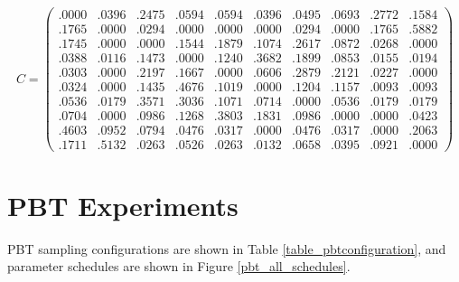 \documentclass{article}
\begin{document}
\begin{table*}
$~$
\begin{equation}
\label{eqn:c_asym_rte}
C = \begin{pmatrix} 
.0000 & .0396 & .2475 & .0594 & .0594 & .0396 & .0495 & .0693 & .2772 & .1584 \\
.1765 & .0000 & .0294 & .0000 & .0000 & .0000 & .0294 & .0000 & .1765 & .5882 \\ 
.1745 & .0000 & .0000 & .1544 & .1879 & .1074 & .2617 & .0872 & .0268 & .0000 \\ 
.0388 & .0116 & .1473 & .0000 & .1240 & .3682 & .1899 & .0853 & .0155 & .0194 \\ 
.0303 & .0000 & .2197 & .1667 & .0000 & .0606 & .2879 & .2121 & .0227 & .0000 \\ 
.0324 & .0000 & .1435 & .4676 & .1019 & .0000 & .1204 & .1157 & .0093 & .0093 \\ 
.0536 & .0179 & .3571 & .3036 & .1071 & .0714 & .0000 & .0536 & .0179 & .0179 \\ 
.0704 & .0000 & .0986 & .1268 & .3803 & .1831 & .0986 & .0000 & .0000 & .0423 \\ 
.4603 & .0952 & .0794 & .0476 & .0317 & .0000 & .0476 & .0317 & .0000 & .2063 \\ 
.1711 & .5132 & .0263 & .0526 & .0263 & .0132 & .0658 & .0395 & .0921 & .0000 
\end{pmatrix} 
\end{equation}
\end{table*}



\section{PBT Experiments}
\label{PBThyper}

PBT sampling configurations are shown in Table \ref{table_pbtconfiguration}, and parameter schedules are shown in Figure \ref{pbt_all_schedules}.
\end{document}
